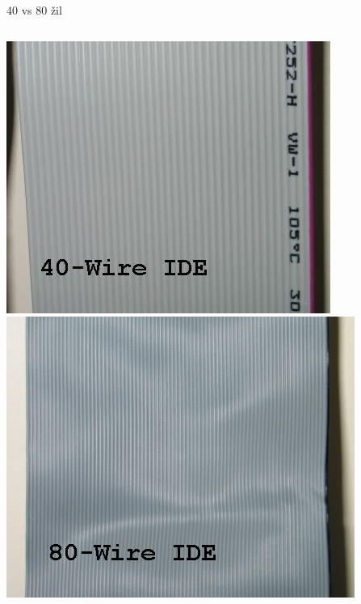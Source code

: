 \documentclass[aspectratio=43]{beamer}
\begin{document}
\begin{frame}{40 vs 80 žil}
	\begin{columns}
		\includegraphics[width=1\linewidth]{extrahovane_obrazky/40IDE.jpeg}
		\includegraphics[width=1\linewidth]{extrahovane_obrazky/80IDE.jpeg}
	\end{columns}
	
\end{frame}
\end{document}

